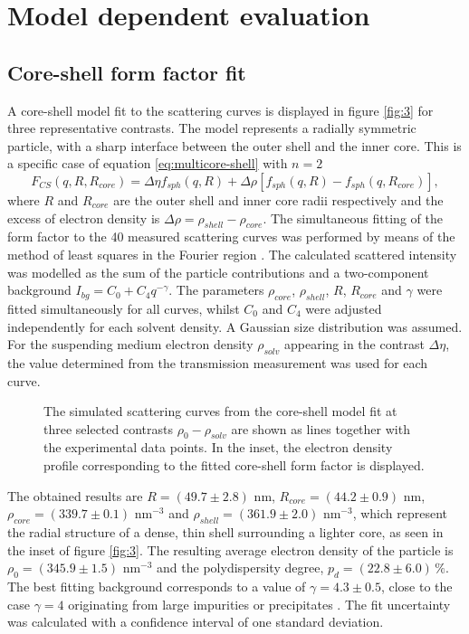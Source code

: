 \section{Model dependent evaluation}
\subsection{Core-shell form factor fit}
\label{sec:coreshell_fit}
A core-shell model fit to the scattering curves is displayed in figure \ref{fig:3} for three representative contrasts. The model represents a radially symmetric particle, with a sharp interface between the outer shell and the inner core. This is a specific case of equation \eqref{eq:multicore-shell} with \( n=2 \)
\begin{equation}
F_{CS}(q,R,R_{core})=\Delta\eta f_{sph}(q,R)+\Delta\rho\left[ f_{sph}(q,R)-f_{sph}(q,R_{core}) \right] ,
\label{eq:ff_cs}
\end{equation}
where \(R \) and \(R_{core} \)  are the outer shell and inner core radii respectively and the excess of electron density is \(\Delta\rho=\rho_{shell}-\rho_{core}\). The simultaneous fitting of the form factor to the 40 measured scattering curves was performed by means of the method of least squares in the Fourier region \citet{Pedersen1997}. The calculated scattered intensity was modelled as the sum of the particle contributions and a two-component background \(I_{bg}=C_0+C_4q^{-\gamma} \). The parameters \(\rho_{core}\), \(\rho_{shell}\), \(R\), \(R_{core}\) and \(\gamma\) were fitted simultaneously for all curves, whilst \( C_0 \) and \( C_4 \) were adjusted independently for each solvent density. A Gaussian size distribution was assumed. For the suspending medium electron density \( \rho_{solv} \) appearing in the contrast \( \Delta\eta \), the value determined from the transmission measurement was used for each curve.

\begin{figure}%
	\centering
		
		\caption{ The simulated scattering curves from the core-shell model fit at three selected contrasts $\rho_0-\rho_{solv}$ are shown as lines together with the experimental data points. In the inset, the electron density profile corresponding to the fitted core-shell form factor is displayed.}
		\label{fig:KiskerSAXSCoreshellFit}
\end{figure}

The obtained results are \(R=\left(49.7 \pm 2.8\right) \) nm, \(R_{core}=\left(44.2 \pm 0.9\right) \) nm, \(\rho_{core}=\left(339.7 \pm 0.1\right)\) nm\(^{-3}\) and \(\rho_{shell}=\left(361.9 \pm 2.0\right)\) nm\(^{-3}\), which represent the radial structure of a dense, thin shell surrounding a lighter core, as seen in the inset of figure \ref{fig:3}. The resulting average electron density of the particle is \(\rho_{0}=\left(345.9 \pm 1.5\right)\) nm\(^{-3}\) and the polydispersity degree, \(p_d=\left(22.8\pm 6.0\right)\,\%\). The best fitting background corresponds to a value of \( \gamma = 4.3\pm 0.5 \), close to the case \( \gamma = 4 \) originating from large impurities or precipitates \citet{Pedersen1994}. The fit uncertainty was calculated with a confidence interval of one standard deviation. 

